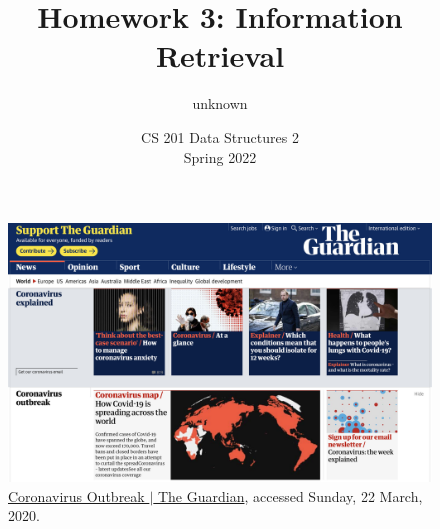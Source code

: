 \documentclass[addpoints]{exam}
\title{Homework 3: Information Retrieval}
\author{unknown}  %
\date{CS 201 Data Structures 2\\Spring 2022}
\begin{document}
\maketitle

\begin{figure}[h]
  \centering
  \includegraphics[width=.9\textwidth]{guardian}
  \caption{\href{https://www.theguardian.com/world/coronavirus-outbreak}{Coronavirus Outbreak $|$ The Guardian}, accessed Sunday, 22 March, 2020.}
  \label{fig:guardian}
\end{figure}
\end{document}
